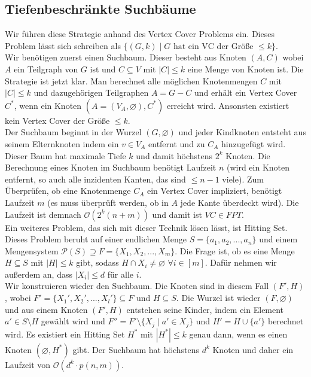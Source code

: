 \documentclass[a4paper, 12pt]{article}
\theoremstyle{plain}
\theoremstyle{definition}
\theoremstyle{lemma}
\theoremstyle{remark}
\theoremstyle{corollary}
\theoremstyle{example}
\begin{document}
	\subsection{Tiefenbeschränkte Suchbäume}
	Wir führen diese Strategie anhand des Vertex Cover Problems ein. Dieses Problem lässt sich schreiben als $\{(G,k) \mid G \text{ hat ein VC der Größe } \leq k\}$.\\
	Wir benötigen zuerst einen Suchbaum. Dieser besteht aus Knoten $(A,C)$ wobei $A$ ein Teilgraph von $G$ ist und $C \subseteq V$ mit $\left|C\right|\leq k$ eine Menge von Knoten ist. Die Strategie ist jetzt klar. Man berechnet alle möglichen Knotenmengen $C$ mit $\left|C\right|\leq k$ und dazugehörigen Teilgraphen $A = G-C$ und erhält ein Vertex Cover $C^*$, wenn ein Knoten $(A=(V_A,\varnothing), C^*)$ erreicht wird. Ansonsten existiert kein Vertex Cover der Größe $\leq k$.\\
	Der Suchbaum beginnt in der Wurzel $(G,\varnothing)$ und jeder Kindknoten entsteht aus seinem Elternknoten indem ein $v \in V_A$ entfernt und zu $C_A$ hinzugefügt wird. Dieser Baum hat maximale Tiefe $k$ und damit höchstens $2^k$ Knoten. Die Berechnung eines Knoten im Suchbaum benötigt Laufzeit $n$ (wird ein Knoten entfernt, so auch alle inzidenten Kanten, das sind $\leq n-1$ viele). Zum Überprüfen, ob eine Knotenmenge $C_A$ ein Vertex Cover impliziert, benötigt Laufzeit $m$ (es muss überprüft werden, ob in $A$ jede Kante überdeckt wird). Die Laufzeit ist demnach $\mathcal{O}(2^k(n+m))$ und damit ist $VC \in FPT$.\\
	
	Ein weiteres Problem, das sich mit dieser Technik lösen lässt, ist Hitting Set. Dieses Problem beruht auf einer endlichen Menge $S = \{a_1,a_2,...,a_n\}$ und einem Mengensystem $\mathcal{P}(S)\supseteq F = \{X_1,X_2,...,X_m\}$. Die Frage ist, ob es eine Menge $H \subseteq S$ mit $\left|H\right| \leq k$ gibt, sodass $H\cap X_i \neq \varnothing$ $\forall i \in [m]$. Dafür nehmen wir außerdem an, dass $\left|X_i\right| \leq d$ für alle $i$.\\
	Wir konstruieren wieder den Suchbaum. Die Knoten sind in diesem Fall $(F',H)$, wobei $F' = \{X_1',X_2',...,X_l'\} \subseteq F$ und $H \subseteq S$. Die Wurzel ist wieder $(F,\varnothing)$ und aus einem Knoten $(F',H)$ entstehen seine Kinder, indem ein Element $a' \in S\setminus H$ gewählt wird und $F'' = F' \setminus \{X_j \mid a' \in X_j\}$ und $H' = H \cup \{a'\}$ berechnet wird. Es existiert ein Hitting Set $H^*$ mit $\left|H^*\right|\leq k$ genau dann, wenn es einen Knoten $(\varnothing, H^*)$ gibt. Der Suchbaum hat höchstens $d^k$ Knoten und daher ein Laufzeit von $\mathcal{O}(d^k\cdot p(n,m))$.\\
	
\end{document}
